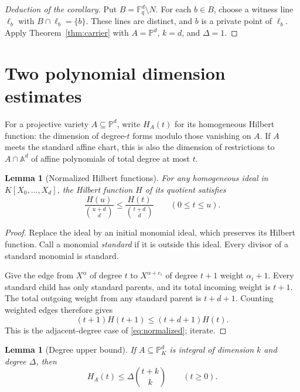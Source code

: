 \documentclass[11pt]{article}
\newcommand{\F}{\mathbb F}
\newcommand{\PP}{\mathbb P}
\newcommand{\A}{\mathbb A}
\newtheorem{lemma}[theorem]{Lemma}
\theoremstyle{remark}
\begin{document}
\begin{proof}[Deduction of the corollary]
Put $B=\F_q^d\setminus N$. For each $b\in B$, choose a witness
line $\ell_b$ with $B\cap\ell_b=\{b\}$. These lines are distinct,
and $b$ is a private point of $\ell_b$. Apply
Theorem~\ref{thm:carrier} with $A=\PP^d$, $k=d$, and $\Delta=1$.
\end{proof}

\section{Two polynomial dimension estimates}

For a projective variety $A\subseteq\PP^d$, write $H_A(t)$ for its
homogeneous Hilbert function: the dimension of degree-$t$ forms
modulo those vanishing on $A$. If $A$ meets the standard affine
chart, this is also the dimension of restrictions to $A\cap\A^d$
of affine polynomials of total degree at most $t$.

\begin{lemma}[Normalized Hilbert functions]\label{lem:normalized}
For any homogeneous ideal in $K[X_0,\ldots,X_d]$, the Hilbert
function $H$ of its quotient satisfies
\begin{equation}\label{eq:normalized}
 \frac{H(u)}{\binom{u+d}{d}}
 \le \frac{H(t)}{\binom{t+d}{d}}
 \qquad(0\le t\le u).
\end{equation}
\end{lemma}

\begin{proof}
Replace the ideal by an initial monomial ideal, which preserves its
Hilbert function. Call a monomial \emph{standard} if it is outside
this ideal. Every divisor of a standard monomial is standard.

Give the edge from $X^\alpha$ of degree $t$ to
$X^{\alpha+e_i}$ of degree $t+1$ weight $\alpha_i+1$.
Every standard child has only standard parents, and its total
incoming weight is $t+1$. The total outgoing weight from any
standard parent is $t+d+1$. Counting weighted edges therefore gives
\[
 (t+1)H(t+1)\le(t+d+1)H(t).
\]
This is the adjacent-degree case of \eqref{eq:normalized}; iterate.
\end{proof}

\begin{lemma}[Degree upper bound]\label{lem:upper}
If $A\subseteq\PP^d_K$ is integral of dimension $k$ and degree
$\Delta$, then
\begin{equation}\label{eq:upper}
 H_A(t)\le\Delta\binom{t+k}{k}\qquad(t\ge0).
\end{equation}
\end{lemma}
\end{document}
